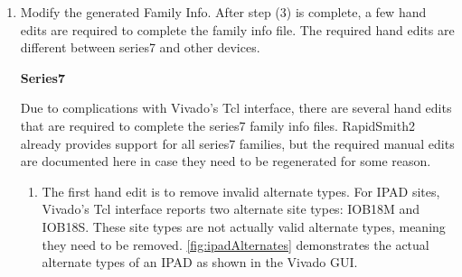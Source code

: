 \begin {enumerate}
\begin{lstlisting}[numbers=none]
Vivado% ::tincr::create_xml_family_info familyInfo.xml kintexu addedBels.txt 
\end{lstlisting}
	
	\noindent As the listing shows, there are three arguments to the command:
	\begin{itemize}
	  \item \textbf{familyInfo.xml}: The file name to store the generated family
	  info. The file ending ``.xml" will be appended if it is not included.
	  \item \textbf{kintexu}: The Vivado family name.
	  \item \textbf{addedBels.txt} (Optional): When you are generating primitive
	  defs using VSRT (in step 1), a text file called ``addedBels.txt" is created in
	  your VSRT directory. This file contains a list of added VCC/GND BELs for
	  each family. To generate a complete Family Info file, pass this text file as
	  the third argument to the above command. The default argument is an empty
	  string so that no extra BELs will be added to the family info.
	\end{itemize}    
    
    \item Modify the generated Family Info. After step (3) is complete, a few
    hand edits are required to complete the family info file. The required hand
    edits are different between series7 and other devices.
    
    \bigbreak \noindent
	\begin{large}
	\textbf{Series7}
	\end{large}
    
    \noindent Due to complications with Vivado's Tcl interface, there are
    several hand edits that are required to complete the series7 family info
    files. RapidSmith2 already provides support for all series7 families, 
    but the required manual edits are documented here in case they need to
    be regenerated for some reason. 
    
    \begin{enumerate}
      \item The first hand edit is to remove invalid alternate types. For IPAD
      sites, Vivado's Tcl interface reports two alternate site types:
      IOB18M and IOB18S. These site types are not actually valid alternate
      types, meaning they need to be removed. \autoref{fig:ipadAlternates}
      demonstrates the actual alternate types of an IPAD as shown in the Vivado
      GUI.
      

\end{enumerate}
\end{enumerate}
